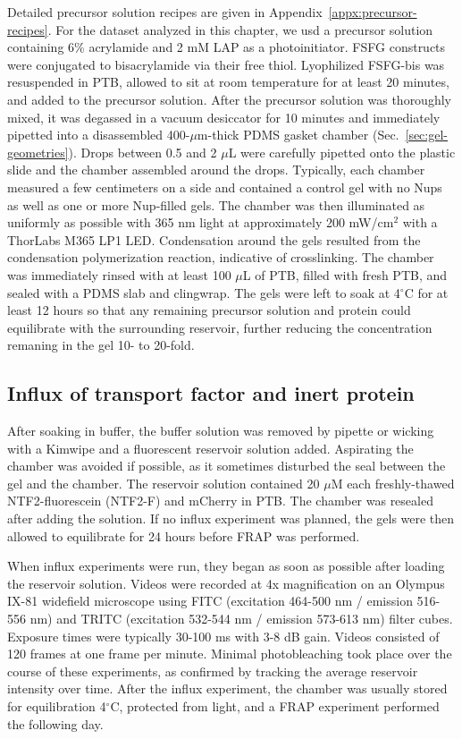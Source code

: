Detailed precursor solution recipes are given in Appendix~\ref{appx:precursor-recipes}.  For the dataset analyzed in this chapter, we usd a precursor solution containing 6\% acrylamide and 2 mM LAP as a photoinitiator.  FSFG constructs were conjugated to bisacrylamide via their free thiol.   Lyophilized FSFG-bis was resuspended in PTB, allowed to sit at room temperature for at least 20 minutes, and added to the precursor solution.  After the precursor solution was thoroughly mixed, it was degassed in a vacuum desiccator for 10 minutes and immediately pipetted into a disassembled 400-$\mu$m-thick PDMS gasket chamber (Sec.~\ref{sec:gel-geometries}).  Drops between 0.5 and 2 $\mu$L were carefully pipetted onto the plastic slide and the chamber assembled around the drops.  Typically, each chamber measured a few centimeters on a side and contained a control gel with no Nups as well as one or more Nup-filled gels.  The chamber was then illuminated as uniformly as possible with 365 nm light at approximately 200 mW/cm$^2$ with a ThorLabs M365 LP1 LED.  Condensation around the gels resulted from the condensation polymerization reaction, indicative of crosslinking.  The chamber was immediately rinsed with at least 100 $\mu$L of PTB, filled with fresh PTB, and sealed with a PDMS slab and clingwrap.  The gels were left to soak at 4$^\circ$C for at least 12 hours so that any remaining precursor solution and protein could equilibrate with the surrounding reservoir, further reducing the concentration remaning in the gel 10- to 20-fold.

\subsection{Influx of transport factor and inert protein}
After soaking in buffer, the buffer solution was removed by pipette or wicking with a Kimwipe and a fluorescent reservoir solution added.  Aspirating the chamber was avoided if possible, as it sometimes disturbed the seal between the gel and the chamber.  The reservoir solution contained 20 $\mu$M each freshly-thawed NTF2-fluorescein (NTF2-F) and mCherry in PTB.  The chamber was resealed after adding the solution.  If no influx experiment was planned, the gels were then allowed to  equilibrate for 24 hours before FRAP was performed.

When influx experiments were run, they began as soon as possible after loading the reservoir solution.  Videos were recorded at 4x magnification on an Olympus IX-81 widefield microscope using FITC (excitation 464-500 nm / emission 516-556 nm) and TRITC (excitation 532-544 nm / emission 573-613 nm) filter cubes.  Exposure times were typically 30-100 ms with 3-8 dB gain.  Videos consisted of 120 frames at one frame per minute. Minimal photobleaching took place over the course of these experiments, as confirmed by tracking the average reservoir intensity over time.  After the influx experiment, the chamber was usually stored for equilibration 4$^\circ$C, protected from light, and a FRAP experiment performed the following day.


